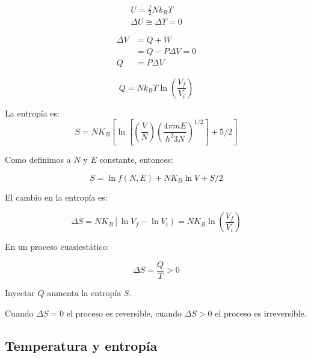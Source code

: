\documentclass[11pt,fleqn]{book}
\begin{document}
\begin{example}

\begin{equation*}\begin{array}{c}
U=\frac{f}{2} N k_{B} T \\
\Delta U\cong\Delta T=0
\end{array}\end{equation*}


\begin{equation*}
\begin{aligned}
\Delta V &=Q+W \\
&=Q-P \Delta V=0 \\
Q &=P \Delta V
\end{aligned}
\end{equation*}


\begin{equation*}
Q=N k_{B} T \ln \left(\frac{V_{f}}{V_{i}}\right)
\end{equation*}

La entropía es:
\begin{equation*}S=N K_{B}\left[\ln \left[\left(\frac{V}{N}\right)\left(\frac{4 \pi m E}{h^{2} 3 N}\right)^{1 / 2}\right]+5 / 2\right]\end{equation*}

Como definimos a $N$ y $E$ constante, entonces:

\begin{equation*}S=\ln f(N, E)+N K_{B} \ln V+S / 2\end{equation*}

El cambio en la entropía es:
    
\begin{equation*}\Delta S=N K_{B}\left[\ln V_{f}-\ln V_{i}\right)=N K_{B} \ln \left(\frac{V_{f}}{V_{i}}\right)\end{equation*}
\end{example}

En un proceso cuasiestático:

\begin{equation}\Delta S=\frac{Q}{T}>0\end{equation}

Inyectar $Q$ aumenta la entropía $S$.

Cuando $\Delta S=0$ el proceso es reversible, cuando $\Delta S>0$ el proceso es irreversible. 

\subsection{Temperatura y entropía}
\end{document}
